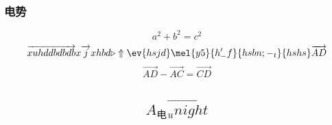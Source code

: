 \subsubsection{电势}
\begin{equation}
a^2+b^2=c^2
\end{equation}
\begin{equation}
\overrightarrow{xuhddbdbdb}x\overrightarrow jxhbd\triangleright\Uparrow\ev{hsjd}\mel{y5}{h'_-f}{hsbn;-_t}{hshs}\overrightarrow{AD}
\end{equation}
\begin{equation}
\overrightarrow{AD}-\overrightarrow{AC}=\overrightarrow{CD}
\end{equation}
\subsection{\begin{equation}
A_电\overrightarrow{_u night}
\end{equation}
}
